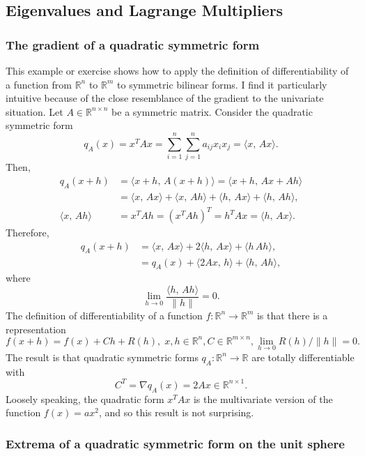\documentclass[10pt]{article}
\newcommand{\R}{\mathds{R}}
\begin{document}
\subsection{Eigenvalues and Lagrange Multipliers}

\subsubsection{The gradient of a quadratic symmetric form}
This example or exercise shows how to apply the definition of differentiability of a function from $\R^n$ to $\R^m$ to symmetric bilinear forms. I find it particularly intuitive because of the close resemblance of the gradient to the univariate situation.  Let $A\in\R^{n\times n}$ be a symmetric matrix. Consider the quadratic symmetric form
\[
q_A(x) = x^T A x = \sum_{i=1}^n\sum_{j=1}^n a_{ij} x_i x_j = \langle x,\, Ax \rangle.
\]
Then,
\begin{align*}
q_A(x+h) &= \langle x+h,\, A(x+h) \rangle = \langle x+h,\, Ax + Ah \rangle\\
 &= \langle x,\, Ax\rangle + \langle x,\, Ah\rangle + \langle h,\, Ax\rangle + \langle h,\, Ah\rangle,\\
\langle x,\, Ah\rangle &= x^T Ah = (x^T Ah)^T = h^T A x = \langle h,\, Ax\rangle .
\end{align*}
Therefore,
\begin{align*}
q_A(x+h) &= \langle x,\, Ax\rangle + 2\langle h,\, Ax\rangle + \langle h\, Ah\rangle,\\
 &= q_A(x) + \langle 2Ax,\, h\rangle + \langle h,\, Ah\rangle ,
\end{align*}
where
\[
\lim_{h \to 0}\frac{\langle h,\, Ah\rangle}{\| h\|} = 0.
\]
The definition of differentiability of a function $f:\R^n\to\R^m$ is that there is a representation
\[
f(x+h) = f(x) + Ch + R(h), \; x,h\in\R^n, C\in\R^{m\times n}, \lim_{h\to 0} R(h)/\|h\|=0.
\] 
The result is that quadratic symmetric forms $q_A: \R^n\to\R$ are totally differentiable with
\[
C^T = \nabla q_A(x) = 2 A x \in \R^{n\times 1}.
\]
Loosely speaking, the quadratic form $x^T A x$ is the multivariate version of the function $f(x)=ax^2$, and so this result is not surprising.

\subsubsection{Extrema of a quadratic symmetric form on the unit sphere}
\end{document}
